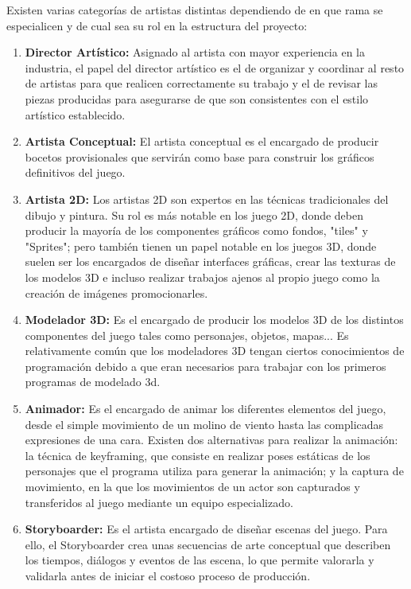 Existen varias categorías de artistas distintas dependiendo de en que rama se especialicen y de cual sea su rol en la estructura del proyecto:
\begin{enumerate}
\item \textbf{Director Artístico:} Asignado al artista con mayor experiencia en la industria, el papel del director artístico es el de organizar y coordinar al resto de artistas para que realicen correctamente su trabajo y el de revisar las piezas producidas para asegurarse de que son consistentes con el estilo artístico establecido.
\item \textbf{Artista Conceptual:} El artista conceptual es el encargado de producir bocetos provisionales que servirán como base para construir los gráficos definitivos del juego.
\item \textbf{Artista 2D:} Los artistas 2D son expertos en las técnicas tradicionales del dibujo y pintura.  Su rol es más notable en los juego 2D, donde deben producir la mayoría de los componentes gráficos como fondos, "tiles" y "Sprites"; pero también tienen un papel notable en los juegos 3D, donde suelen ser los encargados de diseñar interfaces gráficas, crear las texturas de los modelos 3D e incluso realizar trabajos ajenos al propio juego como la creación de imágenes promocionarles.
\item \textbf{Modelador 3D:} Es el encargado de producir los modelos 3D de los distintos componentes del juego tales como personajes, objetos, mapas...  Es relativamente común que los modeladores 3D tengan ciertos conocimientos de programación debido a que eran necesarios para trabajar con los primeros programas de modelado 3d.
\item \textbf{Animador:} Es el encargado de animar los diferentes elementos del juego, desde el simple movimiento de un molino de viento hasta las complicadas expresiones de una cara. Existen dos alternativas para realizar la animación: la técnica de keyframing, que consiste en realizar poses estáticas de los personajes que el programa utiliza para generar la animación; y la captura de movimiento, en la que los movimientos de un actor son capturados y transferidos al juego mediante un equipo especializado.
\item \textbf{Storyboarder:} Es el artista encargado de diseñar escenas del juego. Para ello, el Storyboarder crea unas secuencias de arte conceptual que describen los tiempos, diálogos y eventos de las escena, lo que permite valorarla y validarla antes de iniciar el costoso proceso de producción.
\end{enumerate}

